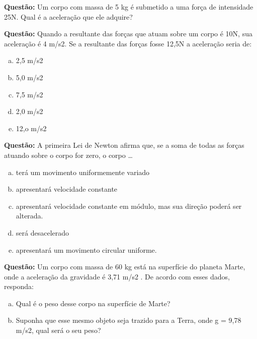 \documentclass[12pt]{memoir}
\title{\textbf{\HUGE {Lista de Exercícios: Dinâmica}}}
\date{}
\newenvironment{questão}{\textbf {Questão:}}{\par\smallskip}
\renewenvironment{questão}{\textbf {Questão:}}{\vspace{1cm}}
\begin{document}
\maketitle
\begin{questão}
Um corpo com massa de 5 kg é submetido a uma força de intensidade 25N. Qual é a aceleração que ele adquire?
\end{questão}

\begin{questão}
Quando a resultante das forças que atuam sobre um corpo é 10N, sua aceleração é 4 m/s2. Se a resultante das forças fosse 12,5N a aceleração seria de:
\end{questão}

\begin{enumerate}[a)]

\item 2,5 m/s2

\item 5,0 m/s2

\item 7,5 m/s2

\item 2,0 m/s2

\item 12,o m/s2

\end{enumerate}



\begin{questão}
A primeira Lei de Newton afirma que, se a soma de todas as forças atuando sobre o corpo for zero, o corpo \ldots

\begin{enumerate}[a)]

\item terá um movimento uniformemente variado

\item apresentará velocidade constante

\item apresentará velocidade constante em módulo, mas sua direção poderá ser alterada.

\item será desacelerado

\item apresentará um movimento circular uniforme.

\end{enumerate}
\end{questão}



\begin{questão}
Um corpo com massa de 60 kg está na superfície do planeta Marte, onde a aceleração da gravidade é 3,71 m/s2 . De acordo com esses dados, responda:

\begin{enumerate}[a)]
\item Qual é o peso desse corpo na superfície de Marte?
\item Suponha que esse mesmo objeto seja trazido para a Terra, onde g = 9,78 m/s2, qual será o seu peso?


\end{enumerate}
\end{questão}
\end{document}
